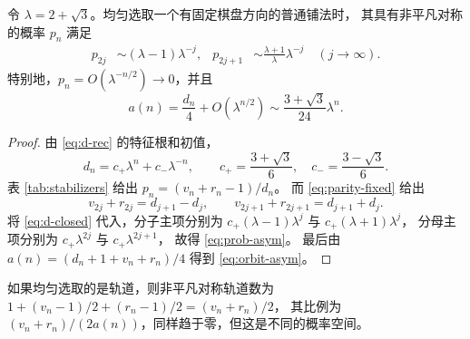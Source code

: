 \begin{theorem}[对称铺法的渐近比例]\label{thm:asym}
令 $\lambda=2+\sqrt3$。均匀选取一个有固定棋盘方向的普通铺法时，
其具有非平凡对称的概率 $p_n$ 满足
\begin{align}
 p_{2j}&\sim(\lambda-1)\lambda^{-j},&
 p_{2j+1}&\sim\frac{\lambda+1}{\lambda}\lambda^{-j}
 \quad(j\to\infty).\label{eq:prob-asym}
\end{align}
特别地，$p_n=O(\lambda^{-n/2})\to0$，并且
\begin{equation}\label{eq:orbit-asym}
 a(n)=\frac{d_n}{4}+O(\lambda^{n/2})
 \sim\frac{3+\sqrt3}{24}\lambda^n.
\end{equation}
\end{theorem}
\begin{proof}
由 \eqref{eq:d-rec} 的特征根和初值，
\begin{equation}\label{eq:d-closed}
 d_n=c_+\lambda^n+c_-\lambda^{-n},\qquad
 c_+=\frac{3+\sqrt3}{6},\quad c_-=\frac{3-\sqrt3}{6}.
\end{equation}
表 \ref{tab:stabilizers} 给出
$p_n=(v_n+r_n-1)/d_n$。
而 \eqref{eq:parity-fixed} 给出
\[
 v_{2j}+r_{2j}=d_{j+1}-d_j,\qquad
 v_{2j+1}+r_{2j+1}=d_{j+1}+d_j.
\]
将 \eqref{eq:d-closed} 代入，分子主项分别为
$c_+(\lambda-1)\lambda^j$ 与 $c_+(\lambda+1)\lambda^j$，
分母主项分别为 $c_+\lambda^{2j}$ 与 $c_+\lambda^{2j+1}$，
故得 \eqref{eq:prob-asym}。
最后由 $a(n)=(d_n+1+v_n+r_n)/4$ 得到 \eqref{eq:orbit-asym}。
\end{proof}

如果均匀选取的是轨道，则非平凡对称轨道数为
$1+(v_n-1)/2+(r_n-1)/2=(v_n+r_n)/2$，
其比例为 $(v_n+r_n)/(2a(n))$，同样趋于零，但这是不同的概率空间。
